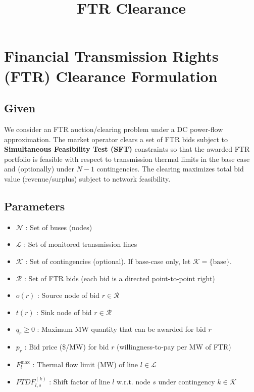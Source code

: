 \documentclass[11pt]{article}
\title{FTR Clearance}
\begin{document}
\maketitle

\section{Financial Transmission Rights (FTR) Clearance Formulation}
\subsection{Given}
We consider an FTR auction/clearing problem under a DC power-flow approximation.
The market operator clears a set of FTR bids subject to \textbf{Simultaneous Feasibility Test (SFT)}
constraints so that the awarded FTR portfolio is feasible with respect to transmission thermal limits
in the base case and (optionally) under $N\!-\!1$ contingencies. The clearing maximizes total bid value
(revenue/surplus) subject to network feasibility.

\subsection {Parameters}
\begin{itemize}
  \item $\mathcal{N}$ : Set of buses (nodes)
  \item $\mathcal{L}$ : Set of monitored transmission lines
  \item $\mathcal{K}$ : Set of contingencies (optional). If base-case only, let $\mathcal{K}=\{\text{base}\}$.
  \item $\mathcal{R}$ : Set of FTR bids (each bid is a directed point-to-point right)
  \item $o(r)$ : Source node of bid $r\in\mathcal{R}$
  \item $t(r)$ : Sink node of bid $r\in\mathcal{R}$
  \item $\bar q_r \ge 0$ : Maximum MW quantity that can be awarded for bid $r$
  \item $p_r$ : Bid price (\$/MW) for bid $r$ (willingness-to-pay per MW of FTR)
  \item $F_l^{\max}$ : Thermal flow limit (MW) of line $l\in\mathcal{L}$
  \item $PTDF^{(k)}_{l,s}$ : Shift factor of line $l$ w.r.t. node $s$ under contingency $k\in\mathcal{K}$

\end{itemize}
\end{document}
